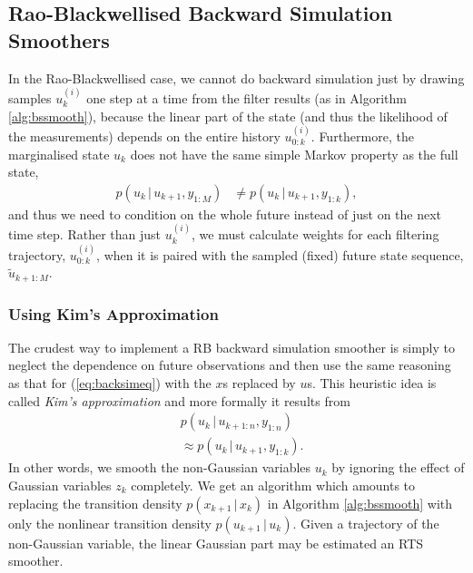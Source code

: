 \documentclass[twocolumn]{autart}    %
\begin{document}
\subsection{Rao-Blackwellised Backward Simulation Smoothers}
%
In the Rao-Blackwellised case, we cannot do backward simulation just by drawing samples $u_k^{(i)}$ one step at a time from the filter results (as in Algorithm \ref{alg:bssmooth}), because the linear part of the state (and thus the likelihood of the measurements) depends on the entire history $u^{(i)}_{0:k}$. Furthermore, the marginalised state $u_k$ does not have the same simple Markov property as the full state,
%
\begin{equation}
  \begin{split}
    p(u_{k}\,|\,u_{k+1},y_{1:M})
    &\ne p(u_{k}\,|\,u_{k+1},y_{1:k}),
  \end{split}
  \nonumber
\end{equation}
%
and thus we need to condition on the whole future instead of just on the next time step. Rather than just $u^{(i)}_{k}$, we must calculate weights for each filtering trajectory, $u^{(i)}_{0:k}$, when it is paired with the sampled (fixed) future state sequence, $\tilde{u}_{k+1:M}$.



\subsubsection{Using Kim's Approximation}
%
The crudest way to implement a RB backward simulation smoother is simply to neglect the dependence on future observations and then use the same reasoning as that for (\ref{eq:backsimeq}) with the $x$s replaced by $u$s. This heuristic idea is called {\em Kim's approximation} \cite{Kim:1994,Barber:2006} and more formally it results from
%
\begin{equation}
\begin{split}
 &p(u_{k} \,|\, u_{k+1:n},y_{1:n}) \\
  &\approx p(u_{k} \,|\, u_{k+1},y_{1:k}).
\end{split}
\end{equation}
%
In other words, we smooth the non-Gaussian variables $u_k$ by ignoring the effect of Gaussian variables $z_k$ completely. We get an algorithm which amounts to replacing the transition density $p(x_{k+1}\,|\,x_{k})$ in Algorithm \ref{alg:bssmooth} with only the nonlinear transition density $p(u_{k+1}\,|\,u_{k})$. Given a trajectory of the non-Gaussian variable, the linear Gaussian part may be estimated an RTS smoother.
\end{document}
